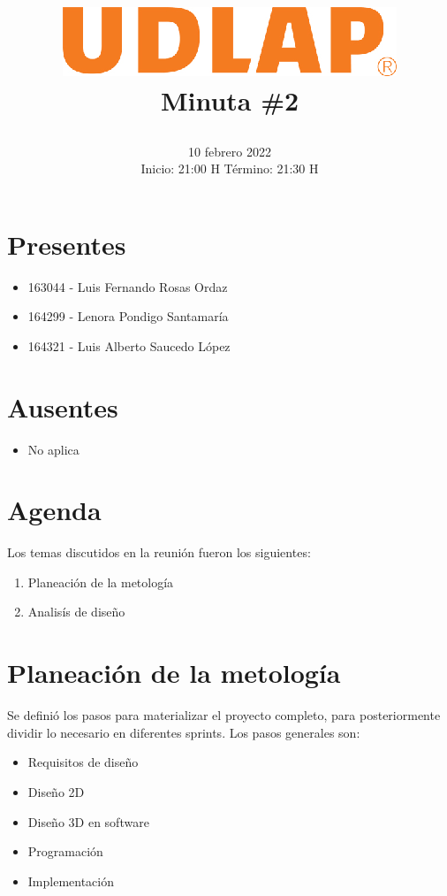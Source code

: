 \documentclass[12pt, a4paper]{article}
\title{
	\includegraphics[width=10cm]{udlap.eps}\vspace{2ex} 
	\\ 
	\titlefont Minuta \#2\vspace{-3ex}
	\author{} %
}
\date{
\huge 10 febrero 2022 \\ \vspace{0.5ex}
\large Inicio: 21:00 H \quad Término: 21:30 H}
\begin{document}
\maketitle %
\begin{minipage}[t]{0.4\textwidth}
\section*{Presentes}
\begin{itemize}
\item 163044 - Luis Fernando Rosas Ordaz
\item 164299 - Lenora Pondigo Santamar\'ia 
\item 164321 - Luis Alberto Saucedo L\'opez 
\end{itemize}
\end{minipage}
\begin{minipage}[t]{0.5\textwidth}
\section*{Ausentes}
\begin{itemize}
\item No aplica
\end{itemize}
\end{minipage}

\section*{Agenda}
Los temas discutidos en la reuni\'on fueron los siguientes:
\begin{enumerate}
\item Planeación de la metología
\item Analisís de diseño
\end{enumerate}
\section{Planeación de la metología}
Se definió los pasos para materializar  el proyecto completo, para posteriormente dividir lo necesario en diferentes sprints. Los pasos generales son:
\begin{itemize}
    \item Requisitos de diseño
    \item Diseño 2D
    \item Diseño 3D en software
    \item Programación
    \item Implementación
    \end{itemize}
\end{document}
